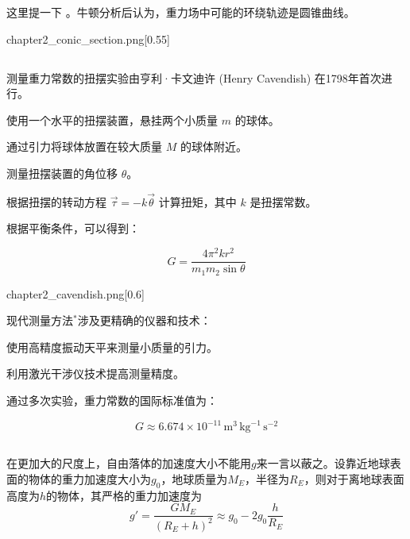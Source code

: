 这里提一下 。牛顿分析后认为，重力场中可能的环绕轨迹是圆锥曲线。
\begin{singlefigure}[圆锥曲线]{chapter2_conic_section.png}[0.55]
\end{singlefigure}
\subsection[测量引力常数]{}
测量重力常数的扭摆实验由亨利·卡文迪许 (Henry Cavendish) 在1798年首次进行。

\begin{Itemize}
    \item 使用一个水平的扭摆装置，悬挂两个小质量 \( m \) 的球体。
    \item 通过引力将球体放置在较大质量 \( M \) 的球体附近。
    \item 测量扭摆装置的角位移 \( \theta \)。
    \item 根据扭摆的转动方程 \( \vec{\tau} = -k \vec{\theta} \) 计算扭矩，其中 \( k \) 是扭摆常数。
\end{Itemize}

根据平衡条件，可以得到：

\[
    G = \frac{4 \pi^2 k r^2}{m_1 m_2 \sin\theta}
\]
\begin{singlefigure}[扭摆实验]{chapter2_cavendish.png}[0.6]
\end{singlefigure}
现代测量方法$^*$涉及更精确的仪器和技术：

\begin{Itemize}
    \item 使用高精度振动天平来测量小质量的引力。
    \item 利用激光干涉仪技术提高测量精度。
\end{Itemize}

通过多次实验，重力常数的国际标准值为：

\[
    G \approx 6.674 \times 10^{-11} \, \text{m}^3 \, \text{kg}^{-1} \, \text{s}^{-2}
\]

\subsection[自由落体加速度]{}
在更加大的尺度上，自由落体的加速度大小不能用$g$来一言以蔽之。设靠近地球表面的物体的重力加速度大小为$g_0$，地球质量为$M_E$，半径为$R_E$，则对于离地球表面高度为$h$的物体，其严格的重力加速度为
\[g'=\frac{GM_{E}}{(R_{E}+h)^{2}}\approx g_{0}-2g_{0}\frac{h}{R_{E}}\]
